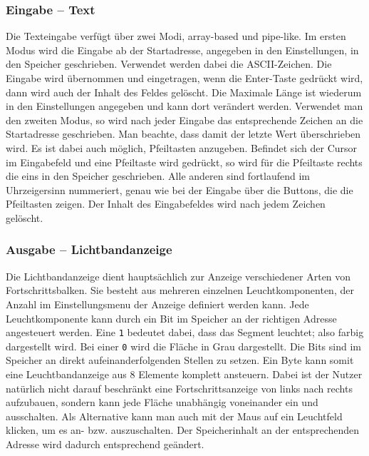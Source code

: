 \subsubsection{Eingabe -- Text}
Die Texteingabe verfügt über zwei Modi, array-based und pipe-like.
Im ersten Modus wird die Eingabe ab der Startadresse, angegeben in den Einstellungen, in den Speicher geschrieben. Verwendet werden dabei die ASCII-Zeichen. Die Eingabe wird übernommen und eingetragen, wenn die Enter-Taste gedrückt wird, dann wird auch der Inhalt des Feldes gelöscht. Die Maximale Länge ist wiederum in den Einstellungen angegeben und kann dort verändert werden. Verwendet man den zweiten Modus, so wird nach jeder Eingabe das entsprechende Zeichen an die Startadresse geschrieben. Man beachte, dass damit der letzte Wert überschrieben wird. Es ist dabei auch möglich, Pfeiltasten anzugeben. Befindet sich der Cursor im Eingabefeld und eine Pfeiltaste wird gedrückt, so wird für die Pfeiltaste rechts die eins in den Speicher geschrieben. Alle anderen sind fortlaufend im Uhrzeigersinn nummeriert, genau wie bei der Eingabe über die Buttons, die die Pfeiltasten zeigen. Der Inhalt des Eingabefeldes wird nach jedem Zeichen gelöscht.

\subsubsection{Ausgabe -- Lichtbandanzeige}

Die Lichtbandanzeige dient hauptsächlich zur Anzeige verschiedener Arten von Fortschrittsbalken.
Sie besteht aus mehreren einzelnen Leuchtkomponenten, der Anzahl im Einstellungsmenu der Anzeige definiert werden kann.
Jede Leuchtkomponente kann durch ein Bit im Speicher an der richtigen Adresse angesteuert werden.
Eine \texttt{1} bedeutet dabei, dass das Segment leuchtet; also farbig dargestellt wird. Bei einer \texttt{0} wird die Fläche in Grau dargestellt.
Die Bits sind im Speicher an direkt aufeinanderfolgenden Stellen zu setzen. Ein Byte kann somit eine Leuchtbandanzeige aus 8 Elemente komplett ansteuern. 
Dabei ist der Nutzer natürlich nicht darauf beschränkt eine Fortschrittsanzeige von links nach rechts aufzubauen, sondern kann jede Fläche unabhängig voneinander ein und ausschalten.
Als Alternative kann man auch mit der Maus auf ein Leuchtfeld klicken, um es an- bzw. auszuschalten. Der Speicherinhalt an der entsprechenden Adresse wird dadurch entsprechend geändert.\\


